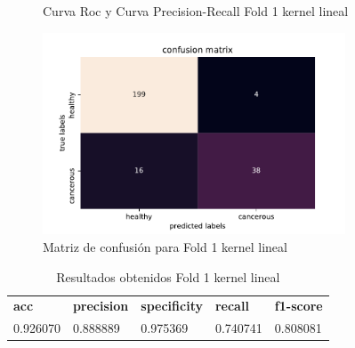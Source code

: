 \begin{figure}[H]
	\centering
	\caption{Curva Roc y Curva Precision-Recall Fold 1 kernel lineal}
	\label{fig:resultados1_linear}
\end{figure}

\begin{figure}[H]
	\centering
	\includegraphics[width=90mm]{imagenes/confusion_mat1_gpflow_linear}
	\caption{Matriz de confusión para Fold 1 kernel lineal}
	\label{fig:conf1_lin}
\end{figure}

\begin{table}[H]
	\centering
	\begin{tabular}{lllll}
		\textbf{acc} & \textbf{precision} & \textbf{specificity} & \textbf{recall} & \textbf{f1-score} \\
		0.926070     & 0.888889           & 0.975369             & 0.740741        & 0.808081         \\
	\end{tabular}
	\caption{Resultados obtenidos Fold 1 kernel lineal}
	\label{table:6}
\end{table}

